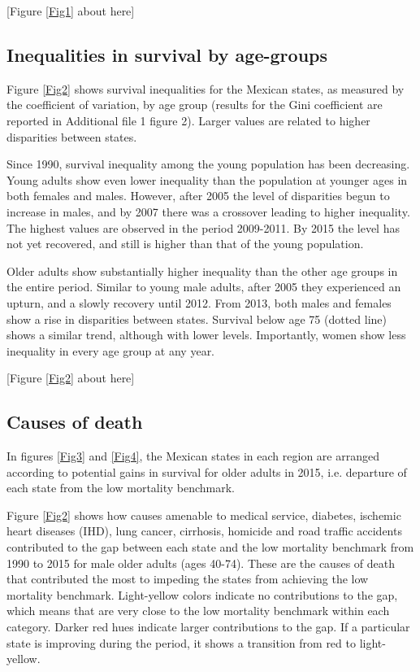 \documentclass{bmcart}
\begin{document}
\begin{center}
[Figure \ref{Fig1} about here]
\end{center}


\subsection*{Inequalities in survival by age-groups}
Figure \ref{Fig2} shows survival inequalities for the Mexican states, as measured by the coefficient of variation, by age group (results for the Gini coefficient are reported in Additional file 1 figure 2). Larger values are related to higher disparities between states. 


Since 1990, survival inequality among the young population has been decreasing. Young adults show even lower inequality than the population at younger ages in both females and males. However, after 2005 the level of disparities begun to increase in males, and by 2007 there was a crossover leading to higher inequality. The highest values are observed in the period 2009-2011. By 2015 the level has not yet recovered, and still is higher than that of the young population.

Older adults show substantially higher inequality than the other age groups in the entire period. Similar to young male adults, after 2005 they experienced an upturn, and a slowly recovery until 2012. From 2013, both males and females show a rise in disparities between states. Survival below age 75 (dotted line) shows a similar trend, although with lower levels. Importantly, women show less inequality in every age group at any year.\\

\begin{center}
[Figure \ref{Fig2} about here]
\end{center}


\subsection*{Causes of death}


In figures \ref{Fig3} and \ref{Fig4}, the Mexican states in each region are arranged according to potential gains in survival for older adults in 2015, i.e. departure of each state from the low mortality benchmark. 

Figure \ref{Fig2} shows how causes amenable to medical service, diabetes, ischemic heart diseases (IHD), lung cancer, cirrhosis, homicide and road traffic accidents contributed to the gap between each state and the low mortality benchmark from 1990 to 2015 for male older adults (ages 40-74). These are the causes of death that contributed the most to impeding the states from achieving the low mortality benchmark. Light-yellow colors indicate no contributions to the gap, which means that are very close to the low mortality benchmark within each category. Darker red hues indicate larger contributions to the gap. If a particular state is improving during the period, it shows a transition from red to light-yellow. 
\end{document}
